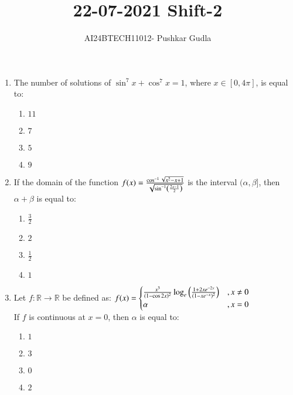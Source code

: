 \documentclass[journal,12pt,onecolumn]{IEEEtran}
\theoremstyle{remark}
\begin{document}

\vspace{3cm}

\title{\textbf{22-07-2021 Shift-2}}
\author{AI24BTECH11012- Pushkar Gudla}
\maketitle
\bigskip

\renewcommand{\thefigure}{\theenumi}
\renewcommand{\thetable}{\theenumi}
\setlength{\columnsep}{2.5em}

\begin{enumerate}
    \item The number of solutions of $ \sin^7 x + \cos^7 x = 1 $, where $ x \in [0, 4\pi] $, is equal to:
    \begin{enumerate}
        \item $11$
        \item $7$
        \item $5$
        \item $9$
    \end{enumerate}

    \item If the domain of the function $f(x) = \frac{\cos^{-1}\sqrt{x^2 - x + 1}}{\sqrt{\sin^{-1}\left(\frac{2x-1}{2}\right)}}$ is the interval $ (\alpha, \beta] $, then $ \alpha + \beta $ is equal to:
    \begin{enumerate}
        \item $ \frac{3}{2} $
        \item $2$
        \item $ \frac{1}{2} $
        \item $1$
    \end{enumerate}

    \item Let $ f : \mathbb{R} \to \mathbb{R} $ be defined as:
    $f(x) =
    \begin{cases}
        \frac{x^3}{(1-\cos 2x)^2}\log_e\left(\frac{1+2xe^{-2x}}{(1-xe^{-x})^2}\right) & , x \neq 0 \\
        \alpha & , x = 0
    \end{cases}$\\
    If $ f $ is continuous at $ x = 0 $, then $ \alpha $ is equal to:
    \begin{enumerate}
        \item $1$
        \item $3$
        \item $0$
        \item $2$
    \end{enumerate}


\end{enumerate}
\end{document}
